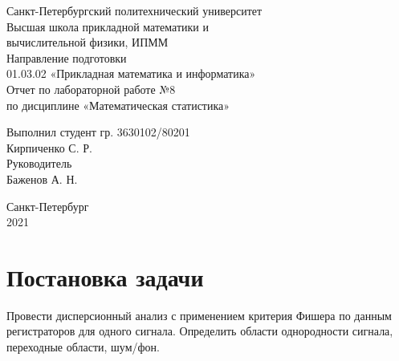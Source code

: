 \documentclass[a4paper,12pt]{article} %
\begin{document}

\large
\begin{center}
    Санкт-Петербургский политехнический университет\\
    Высшая школа прикладной математики и\\вычислительной физики, ИПММ\\
    \vspace{5em}
    Направление подготовки\\
    01.03.02 «Прикладная математика и информатика»\\
    \vspace{3em}
    Отчет по лабораторной работе №8\\
    по дисциплине «Математическая статистика»
    \vspace{15em}
\end{center}
Выполнил студент гр. 3630102/80201\\
Кирпиченко С. Р.\\
Руководитель\\
Баженов А. Н.
\vspace{7em}
\begin{center}
    Санкт-Петербург\\
    2021
\end{center}
\thispagestyle{empty}
\newpage
\tableofcontents
{}
\newpage
\listoffigures
{}
\newpage
\listoftables
{}
\thispagestyle{empty}
\newpage
\section{Постановка задачи}
Провести дисперсионный анализ с применением критерия Фишера по
данным регистраторов для одного сигнала. Определить области однородности
сигнала, переходные области, шум/фон.
\end{document}
